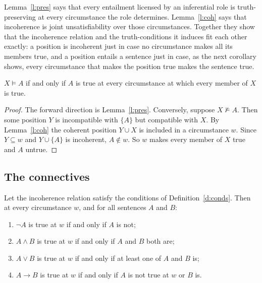 \documentclass{situationist-preprint}
\begin{document}
Lemma~\ref{l:pres} says that every entailment licensed by an inferential role is truth-preserving at every circumstance the role determines. Lemma~\ref{l:coh} says that incoherence is joint unsatisfiability over those circumstances. Together they show that the incoherence relation and the truth-conditions it induces fit each other exactly: a position is incoherent just in case no circumstance makes all its members true, and a position entails a sentence just in case, as the next corollary shows, every circumstance that makes the position true makes the sentence true.

\begin{corollary}\label{c:ent}
$X \models A$ if and only if $A$ is true at every circumstance at which every member of $X$ is true.
\end{corollary}

\begin{proof}
The forward direction is Lemma~\ref{l:pres}. Conversely, suppose $X \not\models A$. Then some position $Y$ is incompatible with $\{A\}$ but compatible with $X$. By Lemma~\ref{l:coh} the coherent position $Y \cup X$ is included in a circumstance $w$. Since $Y \subseteq w$ and $Y \cup \{A\}$ is incoherent, $A \notin w$. So $w$ makes every member of $X$ true and $A$ untrue.
\end{proof}

\subsection{The connectives}

\begin{theorem}\label{t:class}
Let the incoherence relation satisfy the conditions of Definition~\ref{d:conds}. Then at every circumstance $w$, and for all sentences $A$ and $B$:
\begin{enumerate}[label=(\alph*)]
\item $\neg A$ is true at $w$ if and only if $A$ is not;
\item $A \wedge B$ is true at $w$ if and only if $A$ and $B$ both are;
\item $A \vee B$ is true at $w$ if and only if at least one of $A$ and $B$ is;
\item $A \to B$ is true at $w$ if and only if $A$ is not true at $w$ or $B$ is.
\end{enumerate}
\end{theorem}
\end{document}
